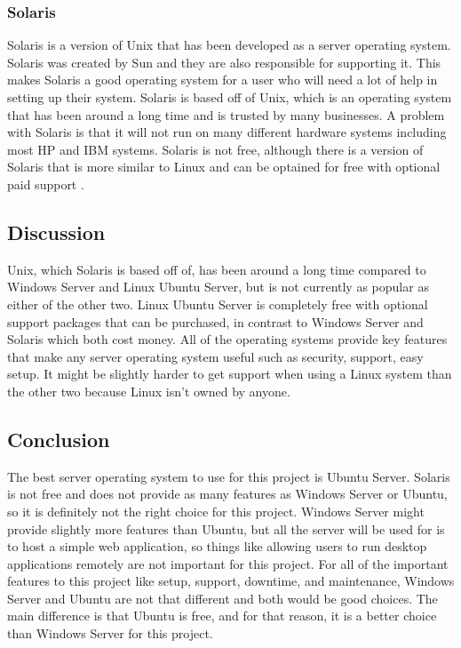 \documentclass[onecolumn, draftclsnofoot,10pt, compsoc]{IEEEtran}
\begin{document}
\subsubsection{Solaris}
Solaris is a version of Unix that has been developed as a server operating system. Solaris was created by Sun and they are also responsible for supporting it. This makes Solaris a good operating system for a user who will need a lot of help in setting up their system. Solaris is based off of Unix, which is an operating system that has been around a long time and is trusted by many businesses. A problem with Solaris is that it will not run on many different hardware systems including most HP and IBM systems. Solaris is not free, although there is a version of Solaris that is more similar to Linux and can be optained for free with optional paid support \cite{solaris}.

\subsection{Discussion}
Unix, which Solaris is based off of, has been around a long time compared to Windows Server and Linux Ubuntu Server, but is not currently as popular as either of the other two. Linux Ubuntu Server is completely free with optional support packages that can be purchased, in contrast to Windows Server and Solaris which both cost money. All of the operating systems provide key features that make any server operating system useful such as security, support, easy setup. It might be slightly harder to get support when using a Linux system than the other two because Linux isn't owned by anyone.

\subsection{Conclusion}
The best server operating system to use for this project is Ubuntu Server. Solaris is not free and does not provide as many features as Windows Server or Ubuntu, so it is definitely not the right choice for this project. Windows Server might provide slightly more features than Ubuntu, but all the server will be used for is to host a simple web application, so things like allowing users to run desktop applications remotely are not important for this project. For all of the important features to this project like setup, support, downtime, and maintenance, Windows Server and Ubuntu are not that different and both would be good choices. The main difference is that Ubuntu is free, and for that reason, it is a better choice than Windows Server for this project.
\end{document}
